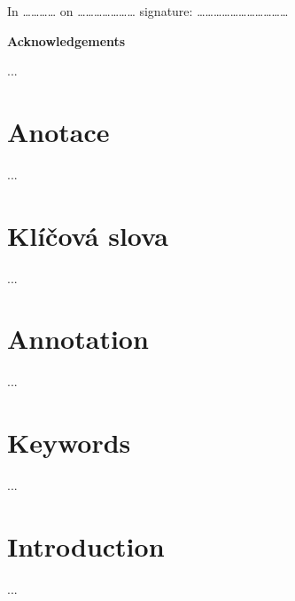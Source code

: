 \documentclass{article}
\begin{document}
\vspace{2cm}

\noindent In ………… on ………………… signature: ……………………………

\newpage

\vspace*{\fill}

\begin{Large}

\noindent \textbf{Acknowledgements}

\end{Large}

\vspace{0.5cm}

\begin{normalsize}
... 
\end{normalsize}

\newpage

\section*{Anotace}
... 

\section*{Klíčová slova}

... 

\section*{Annotation}

...    

\section*{Keywords}

...  

\newpage

\tableofcontents

\newpage

\pagestyle{plain}

\setcounter{page}{6}


\section{Introduction}
\noindent ...
\newpage
\end{document}
